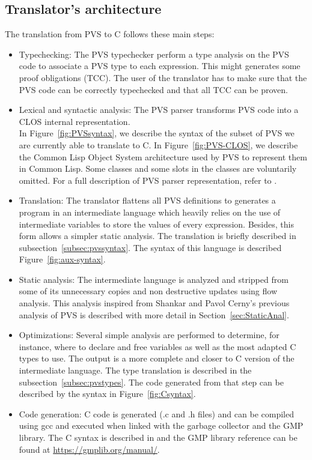 \documentclass[12pt,a4paper]{article}
\begin{document}
\subsection{Translator's architecture}

The translation from PVS \cite{PVS:manuals} to C follows these main steps:
\begin{itemize}
\item Typechecking: The PVS typechecker \cite{PVS:userguide} perform a type analysis on the PVS code to associate a PVS type to each expression. This might generates some proof obligations (TCC). The user of the translator has to make sure that the PVS code can be correctly typechecked and that all TCC can be proven.

\item Lexical and syntactic analysis: The PVS parser transforms PVS \cite{PVS:language} code into a CLOS internal representation. \\

In Figure~\ref{fig:PVSsyntax}, we describe the syntax of the subset of PVS we are currently able to translate to C.
In Figure~\ref{fig:PVS-CLOS}, we describe the Common Lisp Object System architecture used by PVS to represent them in Common Lisp. Some classes and some slots in the classes are voluntarily omitted. For a full description of PVS parser representation, refer to \cite{PVS:api}.

\item Translation: The translator flattens all PVS definitions to generates a program in an intermediate language which heavily relies on the use of intermediate variables to store the values of every expression. Besides, this form allows a simpler static analysis. The translation is briefly described in subsection~\ref{subsec:pvssyntax}. The syntax of this language is described Figure~\ref{fig:aux-syntax}.

\item Static analysis: The intermediate language is analyzed and stripped from some of its unnecessary copies and non destructive updates using flow analysis. This analysis inspired from Shankar \cite{shankar02} and Pavol Cerny's \cite{pavol} previous analysis of PVS is described with more detail in Section~\ref{sec:StaticAnal}.

\item Optimizations: Several simple analysis are performed to determine, for instance, where to declare and free variables as well as the most adapted C types to use. The output is a more complete and closer to C version of the intermediate language. The type translation is described in the subsection~\ref{subsec:pvstypes}. The code generated from that step can be described by the syntax in Figure~\ref{fig:Csyntax}. 

\item Code generation: C code is generated (.c and .h files) and can be compiled using gcc and executed when linked with the garbage collector and the GMP library. The C syntax is described in \cite{huss2004c} and the GMP library reference can be found at \href{https://gmplib.org/manual/}{https://gmplib.org/manual/}.
\end{itemize}
\end{document}
